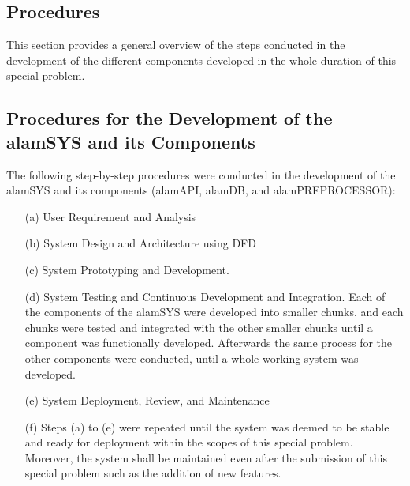 \subsection{Procedures}
\label{subsec:procedures}
This section provides a general overview of the steps conducted
in the development of the different components developed in the
whole duration of this special problem.

\subsection{Procedures for the Development of the alamSYS and its Components}
\label{subsec:proc_alamSYS}
The following step-by-step procedures were conducted in the development
of the alamSYS and its components (alamAPI, alamDB, and alamPREPROCESSOR):
\begin{itemize}
    \item[(a)] User Requirement and Analysis
    \item[(b)] System Design and Architecture using DFD
    \item[(c)] System Prototyping and Development.
    \item[(d)] System Testing and Continuous Development and Integration.
    Each of the components of the alamSYS were developed into smaller chunks,
    and each chunks were tested and integrated with the other smaller chunks
    until a component was functionally developed. Afterwards the same process for
    the other components were conducted, until a whole working system was developed.
    \item[(e)] System Deployment, Review, and Maintenance
    \item[(f)] Steps (a) to (e) were repeated until the system was deemed
    to be stable and ready for deployment within the scopes of this special
    problem. Moreover, the system shall be maintained even after the submission
    of this special problem such as the addition of new features.
\end{itemize}
\hfill \\



